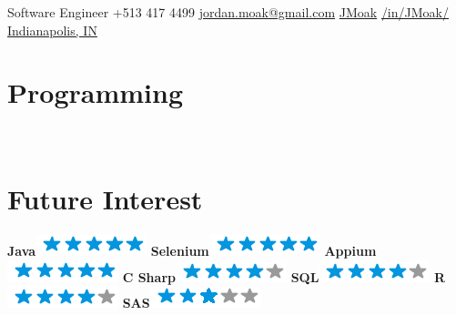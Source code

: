 \documentclass[]{moak-resume}
\begin{document}
            {Software Engineer}
            {\icon{\faPhone} +513 417 4499}
            {\icon{\faEnvelope[regular]} \href{mailto:ordan.moak@gmail.com}{ jordan.moak@gmail.com}}
            {\icon{\faGithub} \href{https://github.com/JMoak/}{ JMoak}}
            {\icon{\faLinkedin} \href{https://www.linkedin.com/JMoak}{ /in/JMoak/}}
            {\icon{\faMapMarker} \href{https://www.google.com/maps/dir/Indianapolis,+IN/10661+N+Park+Ave,+Indianapolis,+IN+46280/@39.855518,-86.2220929,12z/data=!3m1!4b1!4m13!4m12!1m5!1m1!1s0x886b50ffa7796a03:0xd68e9df640b9ea7c!2m2!1d-86.158068!2d39.768403!1m5!1m1!1s0x8814ace9334d6b09:0x27cc5b30c43341c1!2m2!1d-86.1480884!2d39.943121}{ Indianapolis, IN}}

\begin{aside}
  \section{Programming}
	\programmingPie{}
    ~
  \section{Future Interest}
    \textbf{Java}\includegraphics[scale=0.40]{img/5stars.png}
    \textbf{Selenium}\includegraphics[scale=0.40]{img/5stars.png}
    \textbf{Appium}\includegraphics[scale=0.40]{img/5stars.png}
    \textbf{C Sharp}\includegraphics[scale=0.40]{img/4stars.png}
    \textbf{SQL}\includegraphics[scale=0.40]{img/4stars.png}
    \textbf{R}\includegraphics[scale=0.40]{img/4stars.png}
    \textbf{SAS}\includegraphics[scale=0.40]{img/3stars.png}
    ~

\end{aside}
\end{document}
